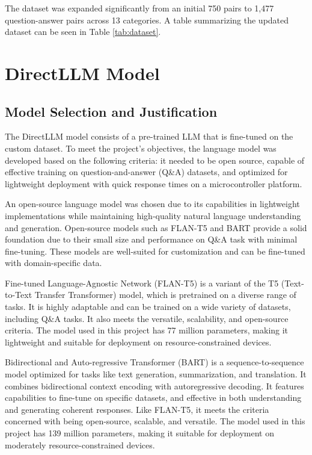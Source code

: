 \documentclass[conference]{IEEEtran}
\begin{document}
The dataset was expanded significantly from an initial 750 pairs to 1,477 question-answer pairs across 13 categories.
A table summarizing the updated dataset can be seen in Table \ref{tab:dataset}.

\section{DirectLLM Model}
\subsection{Model Selection and Justification}
The DirectLLM model consists of a pre-trained LLM that is fine-tuned on the custom dataset.
To meet the project's objectives, the language model was developed based on the following criteria: it needed to be open source, capable of effective training on question-and-answer (Q\&A) datasets, and optimized for lightweight deployment with quick response times on a microcontroller platform.

An open-source language model was chosen due to its capabilities in lightweight implementations while maintaining high-quality natural language understanding and generation.
Open-source models such as FLAN-T5 \cite{b8} and BART \cite{b9} provide a solid foundation due to their small size and performance on Q\&A task with minimal fine-tuning. 
These models are well-suited for customization and can be fine-tuned with domain-specific data.

Fine-tuned Language-Agnostic Network (FLAN-T5) is a variant of the T5 (Text-to-Text Transfer Transformer) model, which is pretrained on a diverse range of tasks. 
It is highly adaptable and can be trained on a wide variety of datasets, including Q\&A tasks. 
It also meets the versatile, scalability, and open-source criteria. 
The model used in this project has 77 million parameters, making it lightweight and suitable for deployment on resource-constrained devices.

Bidirectional and Auto-regressive Transformer (BART) is a sequence-to-sequence model optimized for tasks like text generation, summarization, and translation. 
It combines bidirectional context encoding with autoregressive decoding. 
It features capabilities to fine-tune on specific datasets, and effective in both understanding and generating coherent responses.
Like FLAN-T5, it meets the criteria concerned with being open-source, scalable, and versatile. 
The model used in this project has 139 million parameters, making it suitable for deployment on moderately resource-constrained devices.
\end{document}
